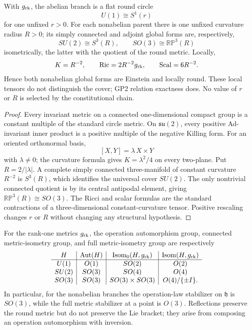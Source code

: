 \documentclass[11pt,a4paper]{article}
\begin{document}
\begin{theorem}
\label{p2:thm:rank-one-space-form-einstein}
With \(g_{\rm rk}\), the abelian branch is a flat round circle
\[
 U(1)\cong S^1(r)
\]
for one unfixed \(r>0\).  For each nonabelian parent there is one unfixed
curvature radius \(R>0\); its simply connected and adjoint global forms are,
respectively,
\[
 SU(2)\cong S^3(R),
 \qquad
 SO(3)\cong\mathbb{RP}^3(R)
\]
isometrically, the latter with the quotient of the round metric.  Locally,
\[
 K=R^{-2},\qquad
 \operatorname{Ric}=2R^{-2}g_{\rm rk},\qquad
 \operatorname{Scal}=6R^{-2}.
\]
Hence both nonabelian global forms are Einstein and locally round.  These
local tensors do not distinguish the cover; GP2 relation exactness does.
No value of \(r\) or \(R\) is selected by the constitutional chain.
\end{theorem}

\begin{proof}
Every invariant metric on a connected one-dimensional compact group is a
constant multiple of the standard circle metric.  On
\(\mathfrak{su}(2)\), every positive Ad-invariant inner product is a positive
multiple of the negative Killing form.  For an oriented orthonormal basis,
\[
 [X,Y]=\lambda\,X\times Y
\]
with \(\lambda\ne0\); the curvature formula gives
\(K=\lambda^2/4\) on every two-plane.  Put \(R=2/|\lambda|\).  A complete
simply connected three-manifold of constant curvature \(R^{-2}\) is
\(S^3(R)\), which identifies the universal cover \(SU(2)\).  The only
nontrivial connected quotient is by its central antipodal element, giving
\(\mathbb{RP}^3(R)\cong SO(3)\).  The Ricci and scalar formulas are the
standard contractions of a three-dimensional constant-curvature tensor.
Positive rescaling changes \(r\) or \(R\) without changing any structural
hypothesis.
\end{proof}

\begin{theorem}
\label{p2:thm:rank-one-exact-symmetry-groups}
For the rank-one metrics \(g_{\rm rk}\), the operation automorphism group,
connected
metric-isometry group, and full metric-isometry group are respectively
\[
\begin{array}{c|c|c|c}
H&
\operatorname{Aut}(H)&
\operatorname{Isom}_0(H,g_{\rm rk})&
\operatorname{Isom}(H,g_{\rm rk})\\ \hline
U(1)&O(1)&SO(2)&O(2)\\
SU(2)&SO(3)&SO(4)&O(4)\\
SO(3)&SO(3)&SO(3)\times SO(3)&O(4)/\{\pm I\}.
\end{array}
\]
In particular, for the nonabelian branches the operation-law stabilizer on
\(\mathfrak h\) is \(SO(3)\), while the full metric stabilizer at a point is
\(O(3)\).  Reflections preserve the round metric but do not preserve the Lie
bracket; they arise from composing an operation automorphism with inversion.
\end{theorem}
\end{document}
